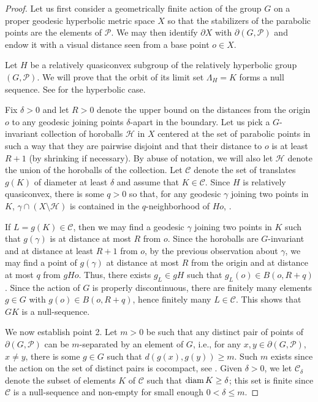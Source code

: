 \documentclass[11pt]{article}
\theoremstyle{definition}
\newcommand\CCC{\mathcal{C}}
\newcommand\PP{\mathcal{P}}
\begin{document}
\begin{proof}
Let us first consider a 
geometrically finite action of the group $G$ on a proper geodesic hyperbolic metric space $X$ so that
the stabilizers of the parabolic points are the elements of $\PP$. We may then identify $\partial X$ with $\partial(G,\PP)$ and endow
it with a visual distance seen from a base point $o\in X$. 

Let $H$ be a relatively quasiconvex subgroup of the relatively hyperbolic group $(G, \mathcal{P})$. We will prove that the orbit of its limit set $\Lambda_H = K$ forms a null sequence.  See \cite[Corollary 2.5]{GMRS} for the hyperbolic case. 

Fix $\delta >0$ and
let $R>0$ denote the upper bound on the distances from the origin $o$ to  any geodesic joining points $\delta$-apart in the boundary. 
Let us pick a  $G$-invariant collection of horoballs $\mathcal{H}$  in $X$ centered at the set of parabolic points 
in such a way  that they are   
pairwise disjoint and that their distance
to $o$ is at least $R+1$ (by shrinking if necessary). By abuse of notation, we will also let $\mathcal{H}$ denote the union of the horoballs of the collection.
Let $\CCC$ denote the set of translates $g(K)$ of diameter at least $\delta$ and assume that $K\in\CCC$.  Since $H$ is relatively quasiconvex,
there is some $q>0$ so that, for any geodesic $\gamma$  joining two points in $K$, $\gamma\cap (X\setminus \mathcal{H})$ is contained in the $q$-neighborhood of $Ho$, \cite[Definition 6.6]{Hruskasurvey}.   


If $L=g(K)\in\CCC$, then we may find a geodesic $\gamma$ joining two points in $K$ such that $g(\gamma)$ is at distance at most $R$ from $o$. Since the horoballs are $G$-invariant and at distance at least $R+1$ from $o$, by the previous observation about $\gamma$, we may find a point of $g(\gamma)$ at distance at most $R$ from the origin and at distance at most $q$ from $gHo$. Thus, there exists $g_L\in gH$ such that $g_L(o)\in B(o,R+q)$.
 Since the action
of $G$ is properly discontinuous, there are finitely many elements $g\in G$ with $g(o)\in B(o,R+q)$, hence finitely many $L\in\CCC$. This shows  that $GK$ is a null-sequence.

\medskip

 We now establish point 2. 
 Let $m>0$ be such that any distinct pair of points of $\partial(G, \PP)$ can be $m$-separated by an element of $G$, i.e., for any $x,y\in\partial(G,\PP)$, $x\neq y$,
 there is some $g\in G$ such that $d(g(x),g(y))\ge m$.  Such $m$ exists since the action on the set of distinct pairs is cocompact, see \cite{TukiaConical}. 
Given $\delta>0$, we let $\CCC_\delta$ denote the subset 
of elements $K$ of $\CCC$ such that $\hbox{diam}\,K\ge \delta$; this set is  finite since $\CCC$ is a null-sequence
and non-empty for small enough $0<\delta \le m$. 


\end{proof}
\end{document}
